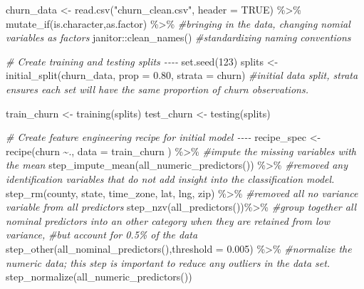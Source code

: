 \documentclass[
]{article}
\newenvironment{Shaded}{\begin{snugshade}}{\end{snugshade}}
\newcommand{\AttributeTok}[1]{\textcolor[rgb]{0.77,0.63,0.00}{#1}}
\newcommand{\CommentTok}[1]{\textcolor[rgb]{0.56,0.35,0.01}{\textit{#1}}}
\newcommand{\ConstantTok}[1]{\textcolor[rgb]{0.00,0.00,0.00}{#1}}
\newcommand{\DecValTok}[1]{\textcolor[rgb]{0.00,0.00,0.81}{#1}}
\newcommand{\FloatTok}[1]{\textcolor[rgb]{0.00,0.00,0.81}{#1}}
\newcommand{\FunctionTok}[1]{\textcolor[rgb]{0.00,0.00,0.00}{#1}}
\newcommand{\NormalTok}[1]{#1}
\newcommand{\OtherTok}[1]{\textcolor[rgb]{0.56,0.35,0.01}{#1}}
\newcommand{\SpecialCharTok}[1]{\textcolor[rgb]{0.00,0.00,0.00}{#1}}
\newcommand{\StringTok}[1]{\textcolor[rgb]{0.31,0.60,0.02}{#1}}
\begin{document}
\begin{Shaded}
\begin{Highlighting}[]
\NormalTok{churn\_data }\OtherTok{\textless{}{-}} \FunctionTok{read.csv}\NormalTok{(}\StringTok{"churn\_clean.csv"}\NormalTok{, }\AttributeTok{header =} \ConstantTok{TRUE}\NormalTok{) }\SpecialCharTok{\%\textgreater{}\%} 
  \FunctionTok{mutate\_if}\NormalTok{(is.character,as.factor) }\SpecialCharTok{\%\textgreater{}\%}                     \CommentTok{\#bringing in the data, changing nomial variables as factors}
\NormalTok{  janitor}\SpecialCharTok{::}\FunctionTok{clean\_names}\NormalTok{()                                    }\CommentTok{\#standardizing naming conventions}

\CommentTok{\# Create training and testing splits {-}{-}{-}{-}}
\FunctionTok{set.seed}\NormalTok{(}\DecValTok{123}\NormalTok{) }
\NormalTok{splits }\OtherTok{\textless{}{-}} \FunctionTok{initial\_split}\NormalTok{(churn\_data, }\AttributeTok{prop =} \FloatTok{0.80}\NormalTok{, }\AttributeTok{strata =}\NormalTok{ churn)  }\CommentTok{\#initial data split, strata ensures each set will have the                                                                      same proportion of churn observations. }

\NormalTok{train\_churn }\OtherTok{\textless{}{-}} \FunctionTok{training}\NormalTok{(splits)}
\NormalTok{test\_churn  }\OtherTok{\textless{}{-}} \FunctionTok{testing}\NormalTok{(splits)}


\CommentTok{\# Create feature engineering recipe for initial model {-}{-}{-}{-}}
\NormalTok{recipe\_spec }\OtherTok{\textless{}{-}} \FunctionTok{recipe}\NormalTok{(churn }\SpecialCharTok{\textasciitilde{}}\NormalTok{., }\AttributeTok{data =}\NormalTok{ train\_churn ) }\SpecialCharTok{\%\textgreater{}\%}
  \CommentTok{\#impute the missing variables with the mean}
  \FunctionTok{step\_impute\_mean}\NormalTok{(}\FunctionTok{all\_numeric\_predictors}\NormalTok{()) }\SpecialCharTok{\%\textgreater{}\%}  
  \CommentTok{\#removed any identification variables that do not add insight into the classification model.}
  \FunctionTok{step\_rm}\NormalTok{(county, state, time\_zone, lat, lng, zip) }\SpecialCharTok{\%\textgreater{}\%} 
  \CommentTok{\#removed all no variance variable from all predictors }
  \FunctionTok{step\_nzv}\NormalTok{(}\FunctionTok{all\_predictors}\NormalTok{())}\SpecialCharTok{\%\textgreater{}\%}
  \CommentTok{\#group together all nominal predictors into an other category when they are retained from low variance, }
  \CommentTok{\#but account for 0.5\% of the data}
  \FunctionTok{step\_other}\NormalTok{(}\FunctionTok{all\_nominal\_predictors}\NormalTok{(),}\AttributeTok{threshold =} \FloatTok{0.005}\NormalTok{) }\SpecialCharTok{\%\textgreater{}\%}
  \CommentTok{\#normalize the numeric data; this step is important to reduce any outliers in the data set. }
  \FunctionTok{step\_normalize}\NormalTok{(}\FunctionTok{all\_numeric\_predictors}\NormalTok{())}


\end{Highlighting}
\end{Shaded}
\end{document}

